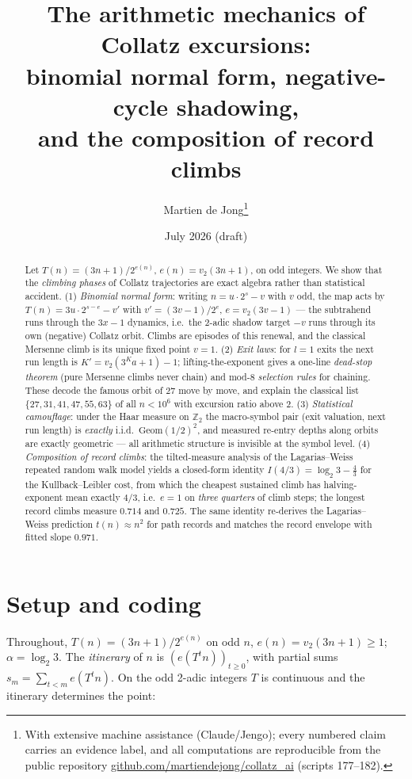 \documentclass[11pt]{article}
\title{The arithmetic mechanics of Collatz excursions:\\
binomial normal form, negative-cycle shadowing,\\ and the composition of record climbs}
\author{Martien de Jong\thanks{With extensive machine assistance (Claude/Jengo);
every numbered claim carries an evidence label, and all computations are
reproducible from the public repository
\href{https://github.com/martiendejong/collatz_ai}{github.com/martiendejong/collatz\_ai}
(scripts 177--182).}}
\date{July 2026 (draft)}
\theoremstyle{definition}
\newcommand{\Z}{\mathbb{Z}}
\newcommand{\vv}{v_2}
\begin{document}
\maketitle

\begin{abstract}
Let $T(n)=(3n+1)/2^{e(n)}$, $e(n)=\vv(3n+1)$, on odd integers. We show that the
\emph{climbing phases} of Collatz trajectories are exact algebra rather than
statistical accident. (1) \emph{Binomial normal form}: writing $n=u\cdot 2^{s}-v$
with $v$ odd, the map acts by $T(n)=3u\cdot 2^{s-e}-v'$ with $v'=(3v-1)/2^{e}$,
$e=\vv(3v-1)$ --- the subtrahend runs through the $3x{-}1$ dynamics, i.e.\ the
2-adic shadow target $-v$ runs through its own (negative) Collatz orbit. Climbs
are episodes of this renewal, and the classical Mersenne climb is its unique
fixed point $v=1$. (2) \emph{Exit laws}: for $l=1$ exits the next run length is
$K'=\vv(3^{K}a+1)-1$; lifting-the-exponent gives a one-line \emph{dead-stop
theorem} (pure Mersenne climbs never chain) and mod-8 \emph{selection rules}
for chaining. These decode the famous orbit of $27$ move by move, and explain
the classical list $\{27,31,41,47,55,63\}$ of all $n<10^{6}$ with excursion
ratio above $2$. (3) \emph{Statistical camouflage}: under the Haar measure on
$\Z_2$ the macro-symbol pair (exit valuation, next run length) is
\emph{exactly} i.i.d.\ $\mathrm{Geom}(1/2)^{2}$, and measured re-entry depths
along orbits are exactly geometric --- all arithmetic structure is invisible at
the symbol level. (4) \emph{Composition of record climbs}: the tilted-measure
analysis of the Lagarias--Weiss repeated random walk model yields a closed-form
identity $I(4/3)=\log_2 3-\tfrac43$ for the Kullback--Leibler cost, from which
the cheapest sustained climb has halving-exponent mean exactly $4/3$, i.e.\
$e=1$ on \emph{three quarters} of climb steps; the longest record climbs
measure $0.714$ and $0.725$. The same identity re-derives the
Lagarias--Weiss prediction $t(n)\approx n^{2}$ for path records and matches the
record envelope with fitted slope $0.971$.
\end{abstract}

\section{Setup and coding}
Throughout, $T(n)=(3n+1)/2^{e(n)}$ on odd $n$, $e(n)=\vv(3n+1)\ge 1$;
$\alpha=\log_2 3$. The \emph{itinerary} of $n$ is $(e(T^{t}n))_{t\ge 0}$, with
partial sums $s_m=\sum_{t<m} e(T^{t}n)$. On the odd 2-adic integers $T$ is
continuous and the itinerary determines the point:
\end{document}
